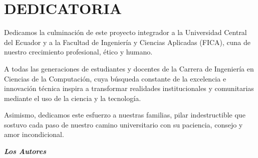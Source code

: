 
\pagestyle{empty}
\onehalfspacing
\fontsize{12}{18}\selectfont

\section*{DEDICATORIA}

\vspace{1.5cm}

Dedicamos la culminación de este proyecto integrador a la Universidad Central del Ecuador y a la Facultad de Ingeniería y Ciencias Aplicadas (FICA), cuna de nuestro crecimiento profesional, ético y humano. 

A todas las generaciones de estudiantes y docentes de la Carrera de Ingeniería en Ciencias de la Computación, cuya búsqueda constante de la excelencia e innovación técnica inspira a transformar realidades institucionales y comunitarias mediante el uso de la ciencia y la tecnología. 

Asimismo, dedicamos este esfuerzo a nuestras familias, pilar indestructible que sostuvo cada paso de nuestro camino universitario con su paciencia, consejo y amor incondicional.

\vspace{2.5cm}

\begin{flushright}
\itshape
\textbf{Los Autores}
\end{flushright}

\newpage
